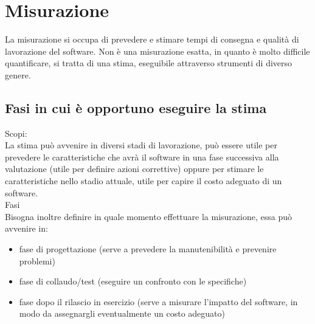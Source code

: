 \documentclass[a4paper,12pt]{report}
\begin{document}
	\section{Misurazione}
	La misurazione si occupa di prevedere e stimare tempi di consegna e qualità di lavorazione del software. Non è una misurazione esatta, in quanto è molto difficile quantificare, si tratta di una stima, eseguibile attraverso strumenti di diverso genere.
	\subsection{Fasi in cui è opportuno eseguire la stima}
	Scopi:\\
	La stima può avvenire in diversi stadi di lavorazione, può essere utile per prevedere le caratteristiche che avrà il software in una fase successiva alla valutazione (utile per definire azioni correttive) oppure per stimare le caratteristiche nello stadio attuale, utile per capire il costo adeguato di un software. \\
	Fasi \\
	Bisogna inoltre definire in quale momento effettuare la misurazione, essa può avvenire in:
	\begin{itemize}
		\item fase di progettazione (serve a prevedere la manutenibilità e prevenire problemi)
		\item fase di collaudo/test (eseguire un confronto con le specifiche)
		\item fase dopo il rilascio in esercizio (serve a misurare l'impatto del software, in modo da assegnargli eventualmente un costo adeguato)
	\end{itemize}
	\newpage
\end{document}
